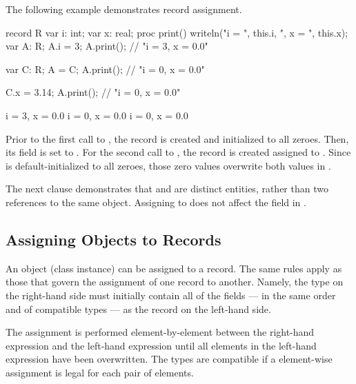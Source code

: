 The following example demonstrates record assignment.
\begin{example}
\begin{chapelpre}
\end{chapelpre}
\begin{chapel}
record R {
  var i: int;
  var x: real;
  proc print() { writeln("i = ", this.i, ", x = ", this.x); }
}
var A: R;
A.i = 3;
A.print();	// "i = 3, x = 0.0"

var C: R;
A = C;
A.print();	// "i = 0, x = 0.0"

C.x = 3.14;
A.print();	// "i = 0, x = 0.0"
\end{chapel}
\begin{chapeloutput}
i = 3, x = 0.0
i = 0, x = 0.0
i = 0, x = 0.0
\end{chapeloutput}
Prior to the first call to , the record  is created and
initialized to all zeroes.  Then, its  field is set to .
For the second call to , the record  is created assigned
to .  Since  is default-initialized to all zeroes, those zero
values overwrite both values in .

The next clause demonstrates that  and  are distinct entities,
rather than two references to the same object.  Assigning 
to  does not affect the  field in .
\end{example}

\subsection{Assigning Objects to Records}
\label{Assigning_Objects_to_Records}

An object (class instance) can be assigned to a record.  The same rules apply as
those that govern the assignment of one record to another.  Namely, the type on
the right-hand side must initially contain all of the fields --- in the same
order and of compatible types --- as the record on the left-hand side.

The assignment is performed element-by-element between the right-hand expression
and the left-hand expression until all elements in the left-hand expression have
been overwritten.  The types are compatible if a element-wise assignment is
legal for each pair of elements.

